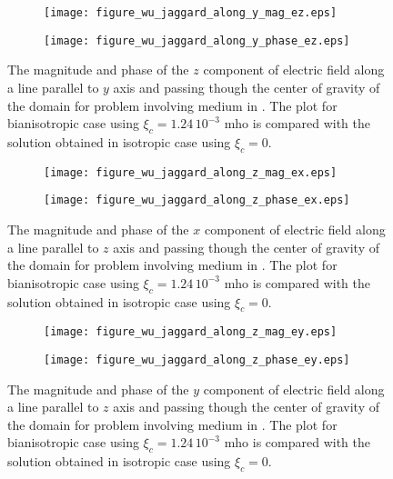 \begin{figure}
\centering
\begin{subfigure}[b]{0.49\textwidth}
\texttt{[image: figure\_wu\_jaggard\_along\_y\_mag\_ez.eps]}
\end{subfigure}
%
\begin{subfigure}[b]{0.49\textwidth}
\centering
\texttt{[image: figure\_wu\_jaggard\_along\_y\_phase\_ez.eps]}
\end{subfigure}
\caption{The magnitude and phase of the $z$ component of electric field along a line parallel to $y$ axis 
and passing though the center of gravity of the domain for problem involving 
medium in \cite{wujaggard}. 
The plot for bianisotropic case  using $\xi_c = 1.24\,10^{-3}$ mho is compared with 
the solution obtained in isotropic case using $\xi_c = 0$.}
\label{fi:wu_jaggard_yaxis_ez}
\end{figure}

\begin{figure}
\centering
\begin{subfigure}[b]{0.49\textwidth}
\texttt{[image: figure\_wu\_jaggard\_along\_z\_mag\_ex.eps]}
\end{subfigure}
%
\begin{subfigure}[b]{0.49\textwidth}
\centering
\texttt{[image: figure\_wu\_jaggard\_along\_z\_phase\_ex.eps]}
\end{subfigure}
\caption{The magnitude and phase of the $x$ component of electric field along a line parallel to $z$ axis 
and passing though the center of gravity of the domain for problem involving 
medium in \cite{wujaggard}. 
The plot for bianisotropic case  using $\xi_c = 1.24\,10^{-3}$ mho is compared with 
the solution obtained in isotropic case using $\xi_c = 0$.}
\label{fi:wu_jaggard_zaxis_ex}
\end{figure}

\begin{figure}
\centering
\begin{subfigure}[b]{0.49\textwidth}
\texttt{[image: figure\_wu\_jaggard\_along\_z\_mag\_ey.eps]}
\end{subfigure}
%
\begin{subfigure}[b]{0.49\textwidth}
\centering
\texttt{[image: figure\_wu\_jaggard\_along\_z\_phase\_ey.eps]}
\end{subfigure}
\caption{The magnitude and phase of the $y$ component of electric field along a line parallel to $z$ axis 
and passing though the center of gravity of the domain for problem involving 
medium in \cite{wujaggard}. 
The plot for bianisotropic case  using $\xi_c = 1.24\,10^{-3}$ mho is compared with 
the solution obtained in isotropic case using $\xi_c = 0$.}
\label{fi:wu_jaggard_zaxis_ey}
\end{figure}


